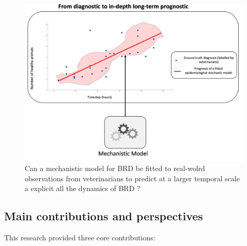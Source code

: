 \begin{figure}[h]
  \includegraphics[width=\linewidth]{figures/chap2/chap1-question2.jpg}
  \caption{Can a mechanistic model for BRD be fitted to real-wolrd observations from veterinarians to predict at a larger temporal scale a explicit all the dynamics of BRD ?}
  \label{fig:chap2-question2}
\end{figure}
\newpage    


\subsection{Main contributions and perspectives}
\label{chap:contributions}
This research provided three core contributions:


